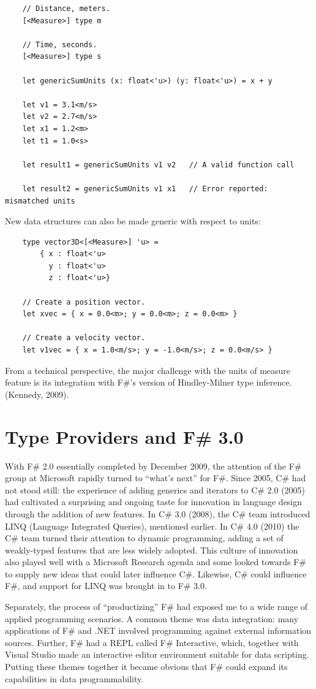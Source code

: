 \documentclass[acmsmall]{acmart}\settopmatter{}
\begin{document}
\begin{verbatim}
    // Distance, meters.
    [<Measure>] type m

    // Time, seconds.
    [<Measure>] type s

    let genericSumUnits (x: float<'u>) (y: float<'u>) = x + y

    let v1 = 3.1<m/s>
    let v2 = 2.7<m/s>
    let x1 = 1.2<m>
    let t1 = 1.0<s>

    let result1 = genericSumUnits v1 v2   // A valid function call

    let result2 = genericSumUnits v1 x1   // Error reported: mismatched units
\end{verbatim}
New data structures can also be made generic with respect to units:
\begin{verbatim}
    type vector3D<[<Measure>] 'u> =
        { x : float<'u>
          y : float<'u>
          z : float<'u>}

    // Create a position vector.
    let xvec = { x = 0.0<m>; y = 0.0<m>; z = 0.0<m> }

    // Create a velocity vector.
    let v1vec = { x = 1.0<m/s>; y = -1.0<m/s>; z = 0.0<m/s> }
\end{verbatim}
From a technical perspective, the major challenge with the units of measure feature is its integration with F\#’s version of Hindley-Milner type inference. (Kennedy, 2009).


\section*{Type Providers and F\# 3.0 }

With F\# 2.0 essentially completed by December 2009, the attention of the F\# group at Microsoft rapidly turned to “what’s next”
for F\#. Since 2005, C\# had not stood still: the experience of adding generics and iterators to C\# 2.0 (2005) had cultivated a
surprising and ongoing taste for innovation in language design through the addition of new features.  In C\# 3.0 (2008), the
C\# team introduced LINQ (Language Integrated Queries), mentioned earlier. In C\# 4.0 (2010) the C\# team turned their
attention to dynamic programming, adding a set of weakly-typed features that are less widely adopted. This culture of innovation
also played well with a Microsoft Research agenda and some looked towards F\# to supply new ideas that could later influence
C\#.  Likewise, C\# could influence F\#, and support for LINQ was brought in to F\# 3.0.

Separately, the process of “productizing” F\# had exposed me to a wide range of applied programming scenarios.  A common theme
was data integration: many applications of F\# and .NET involved programming against external information sources.  Further, F\# had
a REPL called F\# Interactive, which, together with Visual Studio made an interactive editor environment suitable for data scripting.
Putting these themes together it became obvious that F\# could expand its capabilities in data programmability.
\end{document}
